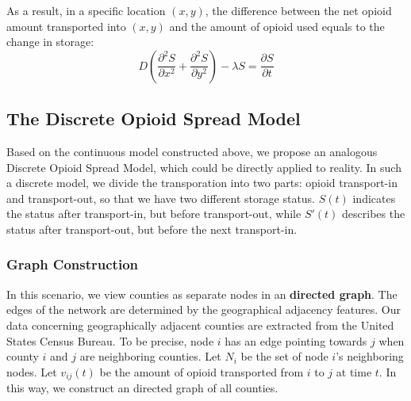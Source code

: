 
As a result, in a specific location $(x,y)$, the difference between the net opioid amount transported into $(x,y)$ and the amount of opioid used equals to the change in storage:
\begin{equation}
D(\frac{\partial^2 S}{\partial x^2} + \frac{\partial^2 S}{\partial y^2}) - \lambda S = \frac{\partial S}{\partial t} 
\end{equation}
\begin{comment}
$S$, however, is unknown. We substitute (1) into (3), and eliminate the common factor $k$ from both sides of the equation
\begin{equation}
D(\frac{\partial^2 F}{\partial x^2} + \frac{\partial^2 F}{\partial y^2}) - \lambda F = \frac{\partial F}{\partial t}
\end{equation}
\end{comment}

\subsection{The Discrete Opioid Spread Model}
Based on the continuous model constructed above, we propose an analogous Discrete Opioid Spread Model, which could be directly applied to reality. In such a discrete model, we divide the transporation into two parts: opioid transport-in and transport-out, so that we have two different storage status. $S(t)$ indicates the status after transport-in, but before transport-out, while $S'(t)$ describes the status after transport-out, but before the next transport-in.

\subsubsection{Graph Construction}
In this scenario, we view counties as separate nodes in an \textbf{directed graph}. The edges of the network are determined by the geographical adjacency features. Our data concerning geographically adjacent counties are extracted from the United States Census Bureau\cite{13}. To be precise, node $i$ has an edge pointing towards $j$ when county $i$ and $j$ are neighboring counties. Let $N_i$ be the set of node $i$'s neighboring nodes. Let $v_{ij}(t)$ be the amount of opioid transported from $i$ to $j$ at time $t$. In this way, we construct an directed graph of all counties. 

